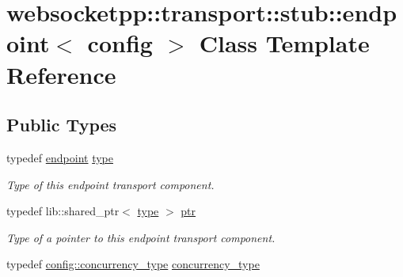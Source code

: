 \hypertarget{classwebsocketpp_1_1transport_1_1stub_1_1endpoint}{}\section{websocketpp\+:\+:transport\+:\+:stub\+:\+:endpoint$<$ config $>$ Class Template Reference}
\label{classwebsocketpp_1_1transport_1_1stub_1_1endpoint}
\subsection*{Public Types}
\begin{DoxyCompactItemize}
\item 
typedef \hyperlink{classwebsocketpp_1_1transport_1_1stub_1_1endpoint}{endpoint} \hyperlink{classwebsocketpp_1_1transport_1_1stub_1_1endpoint_af621f6f1f67f9e3eea1e0d28eb5f60ae}{type}\hypertarget{classwebsocketpp_1_1transport_1_1stub_1_1endpoint_af621f6f1f67f9e3eea1e0d28eb5f60ae}{}\label{classwebsocketpp_1_1transport_1_1stub_1_1endpoint_af621f6f1f67f9e3eea1e0d28eb5f60ae}

\begin{DoxyCompactList}\small\item\em Type of this endpoint transport component. \end{DoxyCompactList}\item 
typedef lib\+::shared\+\_\+ptr$<$ \hyperlink{classwebsocketpp_1_1transport_1_1stub_1_1endpoint_af621f6f1f67f9e3eea1e0d28eb5f60ae}{type} $>$ \hyperlink{classwebsocketpp_1_1transport_1_1stub_1_1endpoint_a00a3092b0664dac9cff00785f2b96e88}{ptr}\hypertarget{classwebsocketpp_1_1transport_1_1stub_1_1endpoint_a00a3092b0664dac9cff00785f2b96e88}{}\label{classwebsocketpp_1_1transport_1_1stub_1_1endpoint_a00a3092b0664dac9cff00785f2b96e88}

\begin{DoxyCompactList}\small\item\em Type of a pointer to this endpoint transport component. \end{DoxyCompactList}\item 
typedef \hyperlink{classwebsocketpp_1_1concurrency_1_1none}{config\+::concurrency\+\_\+type} \hyperlink{classwebsocketpp_1_1transport_1_1stub_1_1endpoint_a1d70a45c1abdc4c84867a94511da067e}{concurrency\+\_\+type}\hypertarget{classwebsocketpp_1_1transport_1_1stub_1_1endpoint_a1d70a45c1abdc4c84867a94511da067e}{}\label{classwebsocketpp_1_1transport_1_1stub_1_1endpoint_a1d70a45c1abdc4c84867a94511da067e}


\end{DoxyCompactItemize}
